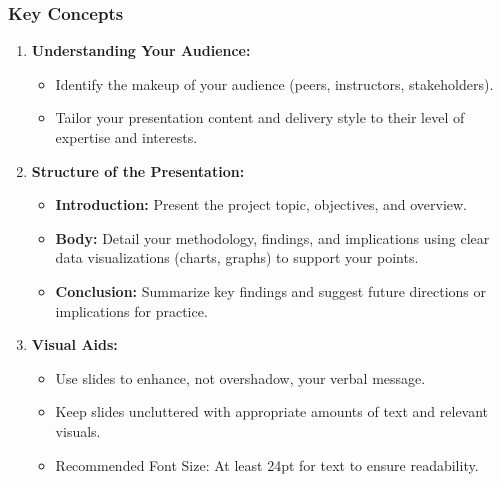 \documentclass[aspectratio=169]{beamer}
\begin{document}
\begin{frame}[fragile]
    \frametitle{Key Concepts}
    
    \begin{enumerate}
        \item \textbf{Understanding Your Audience:}
        \begin{itemize}
            \item Identify the makeup of your audience (peers, instructors, stakeholders).
            \item Tailor your presentation content and delivery style to their level of expertise and interests.
        \end{itemize}
        
        \item \textbf{Structure of the Presentation:}
        \begin{itemize}
            \item \textbf{Introduction:} Present the project topic, objectives, and overview.
            \item \textbf{Body:} Detail your methodology, findings, and implications using clear data visualizations (charts, graphs) to support your points.
            \item \textbf{Conclusion:} Summarize key findings and suggest future directions or implications for practice.
        \end{itemize}
        
        \item \textbf{Visual Aids:}
        \begin{itemize}
            \item Use slides to enhance, not overshadow, your verbal message.
            \item Keep slides uncluttered with appropriate amounts of text and relevant visuals.
            \item Recommended Font Size: At least 24pt for text to ensure readability.
        \end{itemize}
    \end{enumerate}
\end{frame}
\end{document}
